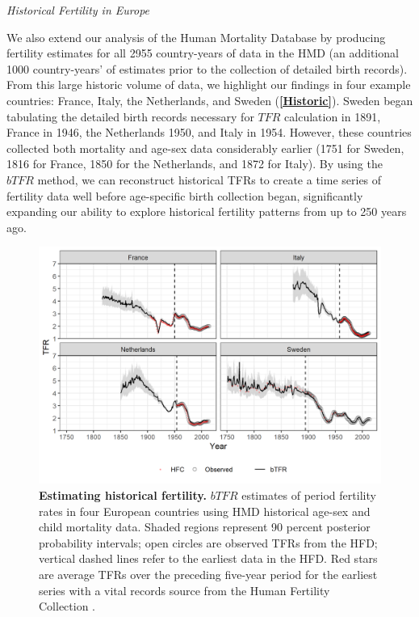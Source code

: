 \documentclass[12pt]{article}
\begin{document}
\emph{Historical Fertility in Europe}

We also extend our analysis of the Human Mortality Database by producing
fertility estimates for all 2955 country-years of data in the HMD (an
additional 1000 country-years' of estimates prior to the collection of
detailed birth records). From this large historic volume of data, we
highlight our findings in four example countries: France, Italy, the
Netherlands, and Sweden (\textbf{\autoref{Historic}}). Sweden began
tabulating the detailed birth records necessary for \(TFR\) calculation
in 1891, France in 1946, the Netherlands 1950, and Italy in 1954.
However, these countries collected both mortality and age-sex data
considerably earlier (1751 for Sweden, 1816 for France, 1850 for the
Netherlands, and 1872 for Italy). By using the \(bTFR\) method, we can
reconstruct historical TFRs to create a time series of fertility data
well before age-specific birth collection began, significantly expanding
our ability to explore historical fertility patterns from up to 250
years ago.

\begin{figure}
\centering
\includegraphics{manuscript_files/figure-latex/plot-historical-hmd-estimates-1.png}
\caption{\textbf{Estimating historical fertility.} \(bTFR\) estimates of
period fertility rates in four European countries using HMD historical
age-sex and child mortality data. Shaded regions represent 90 percent
posterior probability intervals; open circles are observed TFRs from the
HFD; vertical dashed lines refer to the earliest data in the HFD. Red
stars are average TFRs over the preceding five-year period for the
earliest series with a vital records source from the Human Fertility
Collection \citep{HFC}.\label{Historic}}
\end{figure}
\end{document}
